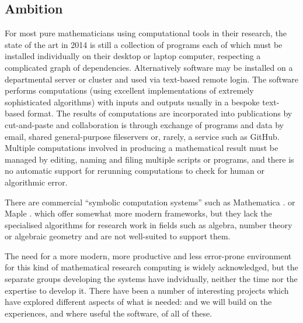 \subsection{Ambition}





For most pure mathematicians using computational tools in their
research, the state of the art in 2014 is still a collection of
programs each of which must be installed individually on their
desktop or laptop computer, respecting a complicated graph of
dependencies. Alternatively software may be installed on a
departmental server or cluster and used via text-based remote
login. The software performs computations (using excellent
implementations of extremely sophisticated algorithms) with inputs and
outputs usually in a bespoke text-based format. The results of
computations are incorporated into publications by cut-and-paste and
collaboration is through exchange of programs and data by email,
shared general-purpose fileservers or, rarely, a service such as
GitHub. Multiple computations involved in producing a mathematical
result must be managed by editing, naming and filing multiple scripts
or programs, and there is no automatic support for rerunning
computations to check for human or algorithmic error. 


There are commercial ``symbolic computation systems'' such as
Mathematica \textsuperscript{\textregistered}. or Maple \textsuperscript{\textregistered}. which offer somewhat more modern frameworks, but
they lack the specialised algorithms for research work in fields such
as algebra, number theory or algebraic geometry and are not
well-suited to support them.

The need for a more modern, more productive and less error-prone
environment for this kind of mathematical research computing is widely
acknowledged, but the separate groups developing the systems have
indvidually, neither the time nor the expertise to develop it. There
have been a number of interesting projects which have explored
different aspects of what is needed:  and we will build on the experiences, and where
useful the software, of all of these.


